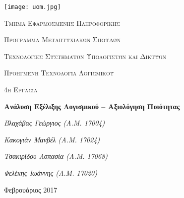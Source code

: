 \begin{titlepage}
	\centering
	\texttt{[image: uom.jpg]}\par\vspace{1cm}
	{\scshape\Large Τμήμα Εφαρμοσμένης Πληροφορικής\par}
	\vspace{1em}
	{\scshape\Large Πρόγραμμα Μεταπτυχιακών Σπουδών\par}
	\vspace{1em}
	{\scshape\Large Τεχνολογίες Συστημάτων Υπολογιστών και Δικτύων\par}
	\vspace{1cm}
	{\scshape\LARGE Προηγμένη Τεχνολογία Λογισμικού\par}
	\vspace{1.5cm}
	{\scshape\Large 4η Εργασία\par}
	{\huge\bfseries Ανάλυση Εξέλιξης Λογισμικού – Αξιολόγηση Ποιότητας \par}
	\vspace{3cm}
	{\Large\itshape Βλαχάβας Γεώργιος (Α.Μ. 17004) \watch\par}
	\vspace{1em}
	{\Large\itshape Κακογιάν Μανβέλ (Α.Μ. 17024) \watch\par}
	\vspace{1em}
	{\Large\itshape Τσακιρίδου Ασπασία (Α.Μ. 17068) \watch\par}
	\vspace{1em}
	{\Large\itshape Φελέκης Ιωάννης	(Α.Μ. 17020) \watch\par}
	\vfill

	{\large Φεβρουάριος 2017\par}
\end{titlepage}
